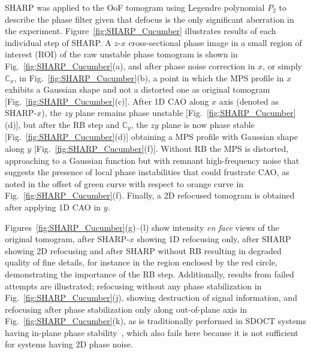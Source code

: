 SHARP was applied to the OoF tomogram using Legendre polynomial $P_2$ to describe the phase filter given that defocus is the only significant aberration in the experiment. Figure~\ref{fig:SHARP_Cucumber} illustrates results of each individual step of SHARP. A $z$-$x$ cross-sectional phase image in a small region of interest (ROI) of the raw unstable phase tomogram is shown in Fig.~\ref{fig:SHARP_Cucumber}(a), and after phase noise correction in $x$, or simply $\mathbb{C}_x$, in Fig.~\ref{fig:SHARP_Cucumber}(b), a point in which the MPS profile in $x$ exhibits a Gaussian shape and not a distorted one as original tomogram [Fig.~\ref{fig:SHARP_Cucumber}(c)]. After 1D CAO along $x$ axis (denoted as SHARP-$x$), the $zy$ plane remains phase unstable [Fig.~\ref{fig:SHARP_Cucumber}(d)], but after the RB step and $\mathbb{C}_y$, the $zy$ plane is now phase stable [Fig.~\ref{fig:SHARP_Cucumber}(d)] obtaining a MPS profile with Gaussian shape along $y$ [Fig.~\ref{fig:SHARP_Cucumber}(f)]. Without RB the MPS is distorted, approaching to a Gaussian function but with remnant high-frequency noise that suggests the presence of local phase instabilities that could frustrate CAO, as noted in the offset of green curve with respect to orange curve in Fig.~\ref{fig:SHARP_Cucumber}(f). Finally, a 2D refocused tomogram is obtained after applying 1D CAO in $y$.

Figures~\ref{fig:SHARP_Cucumber}(g)--(l) show intensity \textit{en face} views of the original tomogram, after SHARP-$x$ showing 1D refocusing only, after SHARP showing 2D refocusing and after SHARP without RB resulting in degraded quality of fine details, for instance in the region enclosed by the red circle, demonstrating the importance of the RB step. Additionally, results from failed attempts are illustrated; refocusing without any phase stabilization in Fig.~\ref{fig:SHARP_Cucumber}(j), showing destruction of signal information, and refocusing after phase stabilization only along out-of-plane axis in Fig.~\ref{fig:SHARP_Cucumber}(k), as is traditionally performed in SDOCT systems having in-plane phase stability~\cite{Shemonski2014_Threedimensional}, which also fails here because it is not sufficient for systems having 2D phase noise.

